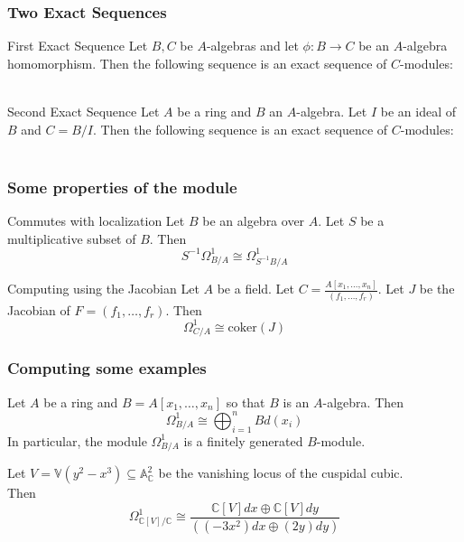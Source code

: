 \documentclass[10pt]{beamer}
\newcommand{\C}{\mathbb{C}}
\newcommand{\A}{\mathbb{A}}
\begin{document}
\begin{frame}[fragile]
\frametitle{Two Exact Sequences}

\begin{block}{First Exact Sequence}
Let $B,C$ be $A$-algebras and let $\phi:B\to C$ be an $A$-algebra homomorphism. Then the following sequence is an exact sequence of $C$-modules: \\
 \\
\end{block}

\begin{block}{Second Exact Sequence}
Let $A$ be a ring and $B$ an $A$-algebra. Let $I$ be an ideal of $B$ and $C=B/I$. Then the following sequence is an exact sequence of $C$-modules: \\
\\
\end{block}

\end{frame}
\begin{frame}[fragile]
\frametitle{Some properties of the module}
\begin{block}{Commutes with localization}
Let $B$ be an algebra over $A$. Let $S$ be a multiplicative subset of $B$. Then $$S^{-1}\Omega_{B/A}^1\cong\Omega_{S^{-1}B/A}^1$$
\end{block}

\begin{block}{Computing using the Jacobian}
Let $A$ be a field. Let $C=\frac{A[x_1,\dots,x_n]}{(f_1,\dots,f_r)}$. Let $J$ be the Jacobian of $F=(f_1,\dots,f_r)$. Then $$\Omega_{C/A}^1\cong\text{coker}(J)$$
\end{block}

\end{frame}

\begin{frame}[fragile]
\frametitle{Computing some examples}

\begin{examples} Let $A$ be a ring and $B=A[x_1,\dots,x_n]$ so that $B$ is an $A$-algebra. Then $$\Omega_{B/A}^1\cong\bigoplus_{i=1}^nBd(x_i)$$ In particular, the module $\Omega_{B/A}^1$ is a finitely generated $B$-module. 
\end{examples}

\begin{examples} Let $V=\mathbb{V}(y^2-x^3)\subseteq\A_\C^2$ be the vanishing locus of the cuspidal cubic. \\

Then $$\Omega_{\C[V]/\C}^1\cong\frac{\C[V]dx\oplus\C[V]dy}{((-3x^2)dx\oplus(2y)dy)}$$
\end{examples}

\end{frame}
\end{document}
